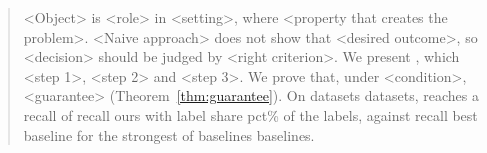 \begin{abstract}
<Object> is <role> in <setting>, where <property that creates the problem>.
<Naive approach> does not show that <desired outcome>, so <decision> should be judged by <right criterion>.
We present \sys{}, which <step 1>, <step 2> and <step 3>.
We prove that, under <condition>, <guarantee> (Theorem~\ref{thm:guarantee}).
On \num{datasets} datasets, \sys{} reaches a recall of \num{recall ours} with \num{label share pct}\% of the labels, against \num{recall best baseline} for the strongest of \num{baselines} baselines.
\end{abstract}
